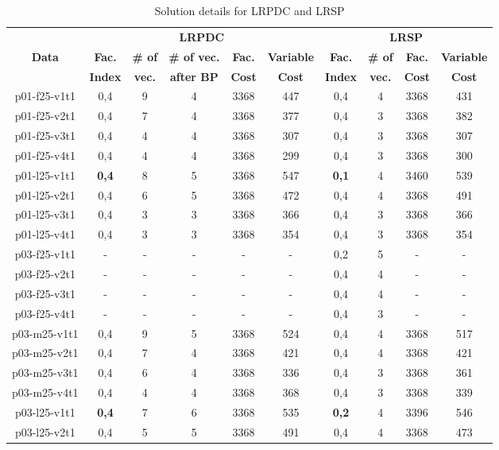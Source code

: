 \begin{table}[h!tbp]
\centering
\caption{Solution details for LRPDC and LRSP}\label{25Cust_lrpdc}
\begin {tabular}[t]{|c|c|c|c|c|c|c|c|c|c|}  
\hline
\mbox{} & \multicolumn{5}{|c|}{{\bf LRPDC}} & \multicolumn{4}{|c|}{{\bf LRSP}} \\\cline{2-10}
{\bf Data} & {\bf Fac.} & {\bf \# of} & {\bf \# of vec.} & {\bf Fac. } & {\bf Variable} &  {\bf Fac.} & {\bf \# of} & {\bf Fac. } & {\bf Variable} \\ 
\mbox{} & {\bf Index} & {\bf vec.} & {\bf after BP} & {\bf Cost} & {\bf Cost} & {\bf Index} & {\bf vec.} & {\bf Cost} & {\bf Cost} \\\hline
p01-f25-v1t1 &	0,4	&	9 &	4	&	3368	&	447	&	0,4	&	4	&	3368	&	431	\\
p01-f25-v2t1 &	0,4	&	7 &	4	&	3368	&	377	&	0,4	&	3	&	3368	&	382	\\
p01-f25-v3t1 &	0,4	&	4 &	4	&	3368	&	307	&	0,4	&	3	&	3368	&	307	\\
p01-f25-v4t1 &	0,4	&	4 &	4	&	3368	&	299	&	0,4	&	3	&	3368	&	300	\\
p01-l25-v1t1 &  {\bf 0,4} &     8 &	5	&	3368	&	547	& {\bf 0,1}	&	4	&	3460	&	539	\\
p01-l25-v2t1 &	0,4	&	6 &	5	&	3368	&	472	&	0,4	&	4	&	3368	&	491	\\
p01-l25-v3t1 &	0,4	&	3 &	3	&	3368	&	366	&	0,4	&	3	&	3368	&	366	\\
p01-l25-v4t1 &	0,4	&	3 &	3	&	3368	&	354	&	0,4	&	3	&	3368	&	354	\\
p03-f25-v1t1 &	-	&	- &	-	&	-	&	-	&	0,2	&	5	&	-	&	-	\\
p03-f25-v2t1 &	-	&	- &	-	&	-	&	-	&	0,4	&	4	&	-	&	-	\\
p03-f25-v3t1 &	-	&	- &	-	&	-	&	-	&	0,4	&	4	&	-	&	-	\\
p03-f25-v4t1 &	-	&	- &	-	&	-	&	-	&	0,4	&	3	&	-	&	-	\\
p03-m25-v1t1 &	0,4	&	9 &	5	&	3368	&	524	&	0,4	&	4	&	3368	&	517	\\
p03-m25-v2t1 &	0,4	&	7 &	4	&	3368	&	421	&	0,4	&	4	&	3368	&	421	\\
p03-m25-v3t1 &	0,4	&	6 &	4	&	3368	&	336	&	0,4	&	3	&	3368	&	361	\\
p03-m25-v4t1 &	0,4	&	4 &	4	&	3368	&	368	&	0,4	&	3	&	3368	&	339	\\
p03-l25-v1t1 &   {\bf 0,4} &	7 &	6	&	3368	&	535	& {\bf 0,2}	&	4	&	3396	&	546	\\
p03-l25-v2t1 &	0,4	&	5 &	5	&	3368	&	491	&	0,4	&	4	&	3368	&	473	\\

\end{tabular}
\end{table}
